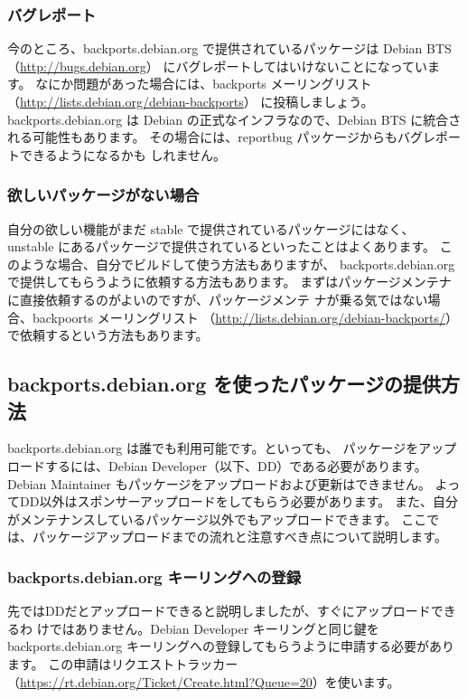 \documentclass[mingoth,a4paper]{jsarticle}
\begin{document}
\subsubsection{バグレポート}
今のところ、backports.debian.org で提供されているパッケージは Debian
BTS（\url{http://bugs.debian.org}） にバグレポートしてはいけないことになっています。
なにか問題があった場合には、backports メーリングリスト（\url{http://lists.debian.org/debian-backports}）
に投稿しましょう。
backports.debian.org は Debian の正式なインフラなので、Debian BTS に統合される可能性もあります。
その場合には、reportbug パッケージからもバグレポートできるようになるかも
しれません。

\subsubsection{欲しいパッケージがない場合}
自分の欲しい機能がまだ stable で提供されているパッケージにはなく、
unstable にあるパッケージで提供されているといったことはよくあります。
このような場合、自分でビルドして使う方法もありますが、
backports.debian.org で提供してもらうように依頼する方法もあります。
まずはパッケージメンテナに直接依頼するのがよいのですが、パッケージメンテ
ナが乗る気ではない場合、backpoorts メーリングリスト
（\url{http://lists.debian.org/debian-backports/}）で依頼するという方法もあります。


\subsection{backports.debian.org を使ったパッケージの提供方法} 

backports.debian.org は誰でも利用可能です。といっても、
パッケージをアップロードするには、Debian Developer（以下、DD）である必要があります。
Debian Maintainer もパッケージをアップロードおよび更新はできません。
よってDD以外はスポンサーアップロードをしてもらう必要があります。
また、自分がメンテナンスしているパッケージ以外でもアップロードできます。
ここでは、パッケージアップロードまでの流れと注意すべき点について説明します。

\subsubsection{backports.debian.org キーリングへの登録}
先ではDDだとアップロードできると説明しましたが、すぐにアップロードできるわ
けではありません。Debian Developer キーリングと同じ鍵を
backports.debian.org キーリングへの登録してもらうように申請する必要があります。
この申請はリクエストトラッカー
（\url{https://rt.debian.org/Ticket/Create.html?Queue=20}）を使います。
\end{document}

